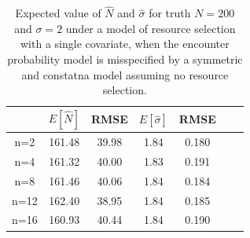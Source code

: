 \documentclass[12pt]{article}
\begin{document}
\begin{table}
\centering
\caption{Expected value of $\hat{N}$ and $\hat{\sigma}$
 for truth
  $N=200$ and $\sigma=2$ under a model of resource selection with a
  single covariate, when the 
encounter probability model is misspecified by a symmetric and
constatna model assuming no resource selection.
}
\begin{tabular}{ccccccc}
\hline \hline
    &   $E[\hat{N}]$ & RMSE & $E[\hat{\sigma}]$ & RMSE \\  \hline 
n=2 &     161.48  & 39.98  & 1.84 &  0.180  \\
n=4 &     161.32  &40.00  & 1.83 &  0.191 \\
n=8 &     161.46  &40.06  & 1.84 &  0.184 \\
n=12 &    162.40  &38.95  & 1.84 &  0.185\\
n=16 &    160.93  &40.44  & 1.84 &  0.190 \\
\end{tabular}
\label{tab.bias}
\end{table}
\end{document}
